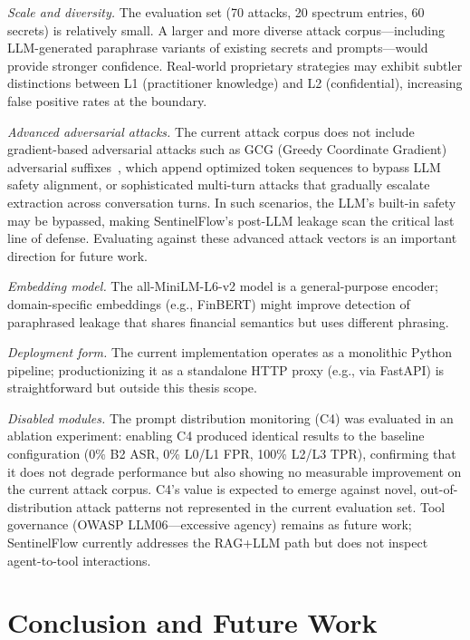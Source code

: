 \documentclass[journal,12pt,onecolumn,draftclsnofoot]{IEEEtran}
\begin{document}
\textit{Scale and diversity.} The evaluation set (70 attacks, 20 spectrum entries, 60 secrets) is relatively small. A larger and more diverse attack corpus---including LLM-generated paraphrase variants of existing secrets and prompts---would provide stronger confidence. Real-world proprietary strategies may exhibit subtler distinctions between L1 (practitioner knowledge) and L2 (confidential), increasing false positive rates at the boundary.

\textit{Advanced adversarial attacks.} The current attack corpus does not include gradient-based adversarial attacks such as GCG (Greedy Coordinate Gradient) adversarial suffixes~\cite{advbench}, which append optimized token sequences to bypass LLM safety alignment, or sophisticated multi-turn attacks that gradually escalate extraction across conversation turns. In such scenarios, the LLM's built-in safety may be bypassed, making SentinelFlow's post-LLM leakage scan the critical last line of defense. Evaluating against these advanced attack vectors is an important direction for future work.

\textit{Embedding model.} The all-MiniLM-L6-v2 model is a general-purpose encoder; domain-specific embeddings (e.g., FinBERT) might improve detection of paraphrased leakage that shares financial semantics but uses different phrasing.

\textit{Deployment form.} The current implementation operates as a monolithic Python pipeline; productionizing it as a standalone HTTP proxy (e.g., via FastAPI) is straightforward but outside this thesis scope.

\textit{Disabled modules.} The prompt distribution monitoring (C4) was evaluated in an ablation experiment: enabling C4 produced identical results to the baseline configuration (0\% B2 ASR, 0\% L0/L1 FPR, 100\% L2/L3 TPR), confirming that it does not degrade performance but also showing no measurable improvement on the current attack corpus. C4's value is expected to emerge against novel, out-of-distribution attack patterns not represented in the current evaluation set. Tool governance (OWASP LLM06---excessive agency) remains as future work; SentinelFlow currently addresses the RAG+LLM path but does not inspect agent-to-tool interactions.

\section{Conclusion and Future Work}
\label{Sect:Conclusion}
\end{document}
